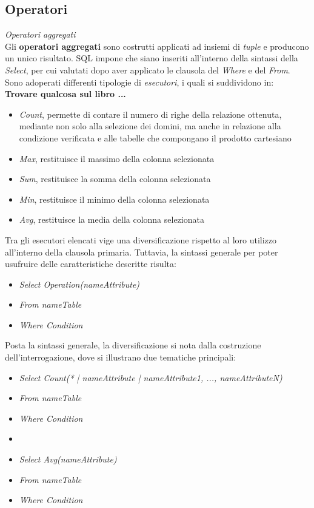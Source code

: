 \documentclass{article}
\begin{document}
\subsection*{Operatori}
\large
\textit{Operatori aggregati}\\
Gli \textbf{operatori aggregati} sono costrutti applicati ad insiemi di \textit{tuple} e producono un unico risultato. SQL impone che siano inseriti all'interno della sintassi della \textit{Select}, per cui valutati dopo aver applicato le clausola del \textit{Where} e del \textit{From}.\vspace*{14pt}\\
Sono adoperati differenti tipologie di \textit{esecutori}, i quali si suddividono in:\\
\textbf{Trovare qualcosa sul libro ...}
\begin{itemize}[label={-}, leftmargin=1cm]
    \itemsep0em
    \item \textit{Count}, permette di contare il numero di righe della relazione ottenuta, mediante non solo alla selezione dei domini, ma anche in relazione alla condizione verificata e alle tabelle che compongano il prodotto cartesiano
    \item \textit{Max}, restituisce il massimo della colonna selezionata
    \item \textit{Sum}, restituisce la somma della colonna selezionata
    \item \textit{Min}, restituisce il minimo della colonna selezionata
    \item \textit{Avg}, restituisce la media della colonna selezionata
\end{itemize}
Tra gli esecutori elencati vige una diversificazione rispetto al loro utilizzo all'interno della clausola primaria. Tuttavia, la sintassi generale per poter usufruire delle caratteristiche descritte risulta:
\begin{itemize}[label={ }, leftmargin=1cm]
    \itemsep0em
    \item \textit{Select Operation(nameAttribute)}
    \item \textit{From nameTable}
    \item \textit{Where Condition}
\end{itemize}
Posta la sintassi generale, la diversificazione si nota dalla costruzione dell'interrogazione, dove si illustrano due tematiche principali:
\begin{itemize}[label={ }, leftmargin=1cm]
    \itemsep0em
    \item \textit{Select Count(* | nameAttribute | nameAttribute1, ..., nameAttributeN)}
    \item \textit{From nameTable}
    \item \textit{Where Condition}
    \item 
    \item \textit{Select Avg(nameAttribute)}
    \item \textit{From nameTable}
    \item \textit{Where Condition}
\end{itemize} 
\end{document}
